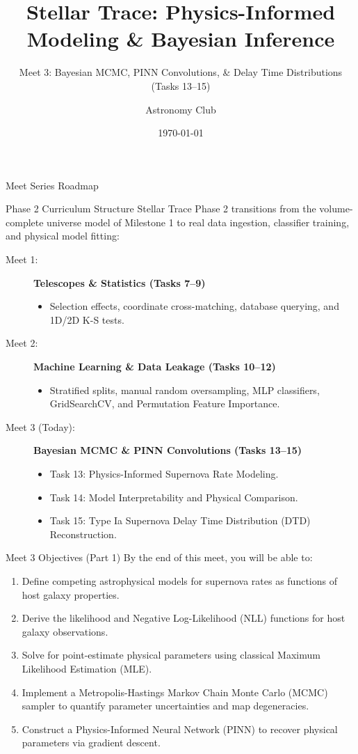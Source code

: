 \documentclass[9pt]{beamer}
\title{Stellar Trace: Physics-Informed Modeling \& Bayesian Inference}
\subtitle{Meet 3: Bayesian MCMC, PINN Convolutions, \& Delay Time Distributions (Tasks 13--15)}
\author{Astronomy Club}
\date{\today}
\begin{document}
\maketitle

\begin{frame}{Meet Series Roadmap}
  \begin{block}{Phase 2 Curriculum Structure}
    Stellar Trace Phase 2 transitions from the volume-complete universe model of Milestone 1 to real data ingestion, classifier training, and physical model fitting:
  \end{block}
  \begin{description}
    \item[Meet 1:] \textbf{Telescopes \& Statistics (Tasks 7--9)}
      \begin{itemize}
        \item Selection effects, coordinate cross-matching, database querying, and 1D/2D K-S tests.
      \end{itemize}
    \item[Meet 2:] \textbf{Machine Learning \& Data Leakage (Tasks 10--12)}
      \begin{itemize}
        \item Stratified splits, manual random oversampling, MLP classifiers, GridSearchCV, and Permutation Feature Importance.
      \end{itemize}
    \item[Meet 3 (Today):] \textbf{Bayesian MCMC \& PINN Convolutions (Tasks 13--15)}
      \begin{itemize}
        \item Task 13: Physics-Informed Supernova Rate Modeling.
        \item Task 14: Model Interpretability and Physical Comparison.
        \item Task 15: Type Ia Supernova Delay Time Distribution (DTD) Reconstruction.
      \end{itemize}
  \end{description}
\end{frame}

\begin{frame}{Meet 3 Objectives (Part 1)}
  By the end of this meet, you will be able to:
  \begin{enumerate}
    \item Define competing astrophysical models for supernova rates as functions of host galaxy properties.
    \item Derive the likelihood and Negative Log-Likelihood (NLL) functions for host galaxy observations.
    \item Solve for point-estimate physical parameters using classical Maximum Likelihood Estimation (MLE).
    \item Implement a Metropolis-Hastings Markov Chain Monte Carlo (MCMC) sampler to quantify parameter uncertainties and map degeneracies.
    \item Construct a Physics-Informed Neural Network (PINN) to recover physical parameters via gradient descent.
  \end{enumerate}
\end{frame}
\end{document}
